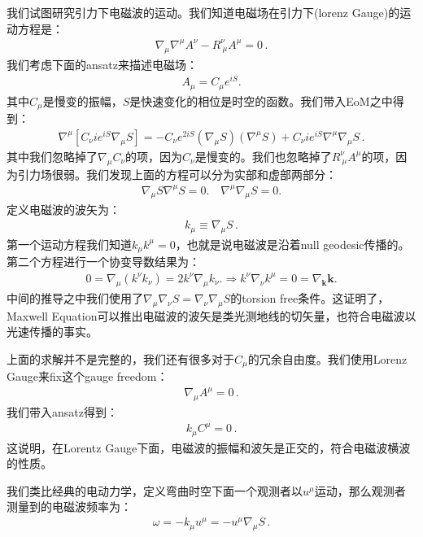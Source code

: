 \bigskip
{}

我们试图研究引力下电磁波的运动。我们知道电磁场在引力下(lorenz Gauge)的运动方程是：
\begin{align}
  \nabla_\mu \nabla^\mu A^\nu - R_{\ \mu}^\nu A^\mu = 0 \, .
\end{align}
我们考虑下面的ansatz来描述电磁场：
\begin{align}
  A_\mu=C_\mu e^{iS}.
\end{align}
其中$ C_\mu $是慢变的振幅，$ S $是快速变化的相位是时空的函数。我们带入EoM之中得到：
\begin{align}
  \nabla^\mu [ C_\nu i e^{iS} \nabla_\mu S ] = -C_\nu e^{2iS}
  (\nabla_\mu S) (\nabla^\mu S) + C_\nu i e^{iS} \nabla^\mu\nabla_\mu S  \, .
\end{align}
其中我们忽略掉了$ \nabla_\mu C_\nu $的项，因为$ C_\nu $是慢变的。我们也忽略掉了$ R_{\ \mu}^\nu
A^\mu $的项，因为引力场很弱。我们发现上面的方程可以分为实部和虚部两部分：
\begin{align}
  \nabla_\mu S\nabla^\mu S=0. \quad \nabla^\mu\nabla_\mu S=0.
\end{align}
定义电磁波的波矢为：
\begin{align}
  k_\mu \equiv \nabla_\mu S \, .
\end{align}
第一个运动方程我们知道$ k_\mu k^\mu = 0 $，也就是说电磁波是沿着null geodesic传播的。第二个方程进行一个协变导数结果为：
\begin{align}
  0=\nabla_\mu(k^\nu k_\nu)=2k^\nu\nabla_\mu k_\nu. \Rightarrow
  k^\nu\nabla_\nu k^\mu=0=\nabla_\mathbf{k}\mathbf{k}.
\end{align}
中间的推导之中我们使用了$ \nabla_\mu \nabla_\nu S = \nabla_\nu \nabla_\mu S
$的torsion free条件。这证明了，Maxwell Equation可以推出电磁波的波矢是类光测地线的切矢量，也符合电磁波以光速传播的事实。

\bigskip
{}

上面的求解并不是完整的，我们还有很多对于$ C_\mu $的冗余自由度。我们使用Lorenz Gauge来fix这个gauge freedom：
\begin{align}
  \nabla_\mu A^\mu = 0 \, .
\end{align}
我们带入ansatz得到：
\begin{align}
  k_\mu C^\mu = 0 \, .
\end{align}
这说明，在Lorentz Gauge下面，电磁波的振幅和波矢是正交的，符合电磁波横波的性质。

\bigskip
{}

我们类比经典的电动力学，定义弯曲时空下面一个观测者以$ u^\mu $运动，那么观测者测量到的电磁波频率为：
\begin{align}
  \omega = -k_\mu u^\mu  = - u^\mu \nabla_\mu S\, .
\end{align}


